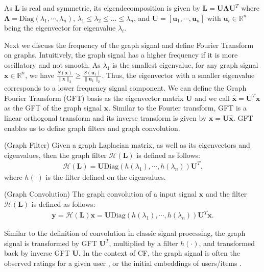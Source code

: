 \documentclass[sigconf]{acmart}
\begin{document}
As $\bm{L}$ is real and symmetric, its eigendecomposition is given by $\bm{L} = \bm{U} \bm{\Lambda} \bm{U}^T$ where $\bm{\Lambda} = \text{Diag}(\lambda_1, \cdots, \lambda_n)$, $\lambda_1 \leq \lambda_2 \leq \dots \leq \lambda_n$, and $\bm{U} = [\bm{u}_1, \cdots, \bm{u}_n]$ with $\bm{u}_i \in \mathbb{R}^n$ being the eigenvector for eigenvalue $\lambda_i$.

Next we discuss the frequency of the graph signal and define Fourier Transform on graphs. Intuitively, the graph signal has a  higher frequency if it is more 
oscillatory and not smooth. As $\lambda_1$ is the smallest eigenvalue, for any graph signal $\bm{x} \in \mathbb{R}^n$, we have $\frac{S(\bm{x})}{\|\bm{x}\|_2} \geq \frac{S(\bm{u}_1)}{\|\bm{u}_1\|_2}$. Thus, the eigenvector with a smaller eigenvalue corresponds to a lower frequency signal component. We can define the Graph Fourier Transform (GFT) basis as the eigenvector matrix $\bm{U}$ and we call $\hat{\bm{x}} = \bm{U}^T \bm{x}$ as the GFT of the graph signal $\bm{x}$. Similar to the Fourier transform, GFT is a linear orthogonal transform and its inverse transform is given by $\bm{x} = \bm{U} \hat{\bm{x}}$. GFT enables us to define graph filters and graph convolution. 
\begin{definition} (Graph Filter)
Given a graph Laplacian matrix, as well as its eigenvectors and eigenvalues, then the graph filter $\mathcal{H}(\bm{L})$ is defined as follows:
\begin{align*}
    \mathcal{H}(\bm{L}) = \bm{U} \text{Diag}(h(\lambda_1), \cdots, h(\lambda_n)) \bm{U}^T.
\end{align*}
where $h(\cdot)$ is the filter defined on the eigenvalues. 
\end{definition}

\begin{definition} (Graph Convolution) The graph convolution of a input signal $\bm{x}$ and the filter  $\mathcal{H}(\bm{L})$ is defined as follows:
\begin{align*}
    \bm{y} = \mathcal{H}(\bm{L}) \bm{x} = \bm{U} \text{Diag}(h(\lambda_1), \cdots, h(\lambda_n)) \bm{U}^T\bm{x}.
\end{align*}
\end{definition}
Similar to the definition of convolution in classic signal processing, the graph signal is transformed by GFT $\bm{U}^T$, multiplied by a filter $h(\cdot)$, and transformed back by inverse GFT $\bm{U}$. In the context of CF, the graph signal is often the observed ratings for a given user \cite{chen2021scalable}, or the initial embeddings of users/items \cite{wang2019neural,he2020lightgcn}.
\end{document}
